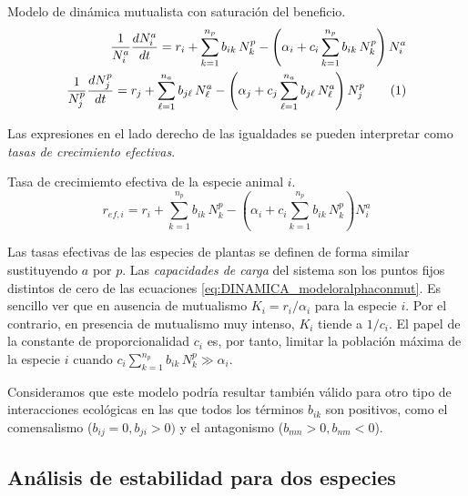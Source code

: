 \begin{theo} 
Modelo de dinámica mutualista con saturación del beneficio.
\begin{align*}
\frac{1}{N^{a}_{i}}\frac{dN^{a}_{i}}{dt} = r_{i}+ \sum_{k=1}^{n_{p}} b_{ik}\, N^{p}_k - \left( \alpha_{i}+ c_{i} \sum_{k=1}^{n_{p}} b_{ik}\, N^{p}_k \right) N^{a}_{i} \nonumber\\
\frac{1}{N^{p}_{j}}\frac{dN^{p}_{j}}{dt} = r_{j}+ \sum_{\ell=1}^{n_{a}} b_{j\ell}\, N^{a}_\ell - \left( \alpha_{j}+ c_{j} \sum_{\ell=1}^{n_{a}} b_{j\ell}\, N^{a}_\ell \right) N^{p}_{j}
\stepcounter{equation}\tag{\theequation}\label{eq:DINAMICA_modeloralphaconmut}
\end{align*}
\end{theo}


Las expresiones en el lado derecho de las igualdades se pueden interpretar como \textit{tasas de crecimiento efectivas}. 

\begin{theo} 
Tasa de crecimiemto efectiva de la especie animal $i$.
\begin{equation}
r_{ef,i} = r_{i} + \sum_{k=1}^{n_{p}} b_{ik}\, N^{p}_k - \left( \alpha_{i}+ c_{i} \sum_{k=1}^{n_{p}} b_{ik}\, N^{p}_k \right) N^{a}_{i}
\label{eq:DINAMICA_effrate}
\end{equation}
\end{theo}

Las tasas efectivas de las especies de plantas se definen de forma similar sustituyendo $a$ por $p$. Las \textit{capacidades de carga} del sistema son los puntos fijos distintos de cero de las ecuaciones \ref{eq:DINAMICA_modeloralphaconmut}. Es sencillo ver que en ausencia de mutualismo $K_i = r_i/\alpha_i$ para la especie $i$. Por el contrario, en presencia de mutualismo muy intenso, $K_i$ tiende a $1/c_{i}$. El papel de la constante de proporcionalidad $c_i$ es, por tanto, limitar la población máxima de la especie $i$ cuando $c_{i} \sum_{k=1}^{n_p} b_{ik} \, N^p_{k} \gg \alpha_{i}$. 

Consideramos que este modelo podría resultar también válido para otro tipo de interacciones ecológicas en las que todos los términos $b_{ik}$ son positivos, como el comensalismo ($b_{ij}=0, b_{ji}>0)$ y el antagonismo ($b_{mn}>0,b_{nm}<0$). 

\subsection{Análisis de estabilidad para dos especies}

